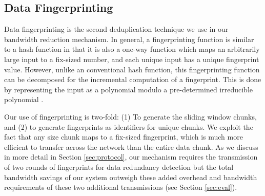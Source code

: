 \subsection{Data Fingerprinting}
\label{sec:fingerprinting}
Data fingerprinting is the second deduplication technique we use in our bandwidth reduction mechanism. In general, a fingerprinting function is similar to a hash function in that it is also a one-way function which maps an arbitrarily large input to a fix-sized number, and each unique input has a unique fingerprint value. However, unlike an conventional hash function, this fingerprinting function can be decomposed for the incremental computation of a fingerprint. This is done by representing the input as a polynomial modulo a pre-determined irreducible polynomial \cite{rabin,lbfs}.

Our use of fingerprinting is two-fold: (1) To generate the sliding window chunks, and (2) to generate fingerprints as identifiers for unique chunks. We exploit the fact that any size chunk maps to a fix-sized fingerprint, which is much more efficient to transfer across the network than the entire data chunk. As we discuss in more detail in Section \ref{sec:protocol}, our mechanism requires the transmission of two rounds of fingerprints for data redundancy detection but the total bandwidth savings of our system outweigh these added overhead and bandwidth requirements of these two additional transmissions (see Section \ref{sec:eval}).